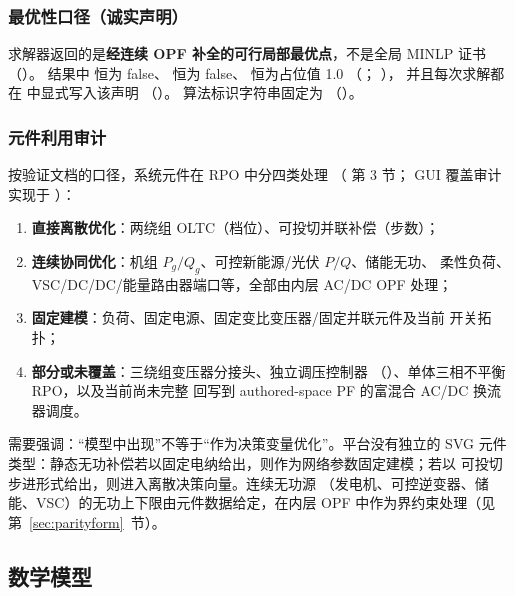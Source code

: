 \subsubsection*{最优性口径（诚实声明）}
求解器返回的是\textbf{经连续 OPF 补全的可行局部最优点}，不是全局 MINLP 证书
（）。
结果中  恒为 false、
恒为 false、 恒为占位值 1.0
（；
），
并且每次求解都在  中显式写入该声明
（）。
算法标识字符串固定为
（）。

\subsubsection*{元件利用审计}
按验证文档的口径，系统元件在 RPO 中分四类处理
（ 第 3 节；
GUI 覆盖审计实现于 ）：
\begin{enumerate}
  \item \textbf{直接离散优化}：两绕组 OLTC（档位）、可投切并联补偿（步数）；
  \item \textbf{连续协同优化}：机组 $P_g/Q_g$、可控新能源/光伏 $P/Q$、储能无功、
        柔性负荷、VSC/DC/DC/能量路由器端口等，全部由内层 AC/DC OPF 处理；
  \item \textbf{固定建模}：负荷、固定电源、固定变比变压器/固定并联元件及当前
        开关拓扑；
  \item \textbf{部分或未覆盖}：三绕组变压器分接头、独立调压控制器
        （）、单体三相不平衡 RPO，以及当前尚未完整
        回写到 authored-space PF 的富混合 AC/DC 换流器调度。
\end{enumerate}
需要强调：“模型中出现”不等于“作为决策变量优化”。平台没有独立的 SVG 元件
类型：静态无功补偿若以固定电纳给出，则作为网络参数固定建模；若以
 可投切步进形式给出，则进入离散决策向量。连续无功源
（发电机、可控逆变器、储能、VSC）的无功上下限由元件数据给定，在内层 OPF
中作为界约束处理（见第~\ref{sec:parityform}~节）。

\subsection{数学模型}

